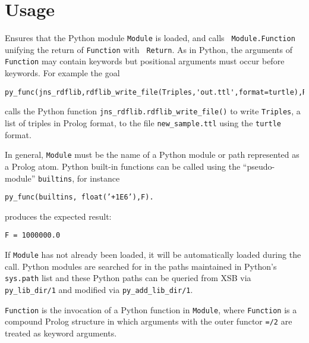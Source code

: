 \section{Usage}

\begin{description}

%
 Ensures that the Python module {\tt Module} is loaded, and calls {\tt
   Module.Function} unifying the return of {\tt Function} with {\tt
   Return}.  As in Python, the arguments of {\tt Function} may contain
 keywords but positional arguments must occur before keywords.  For
 example the goal

\begin{verbatim}
py_func(jns_rdflib,rdflib_write_file(Triples,'out.ttl',format=turtle),Ret).
\end{verbatim}

calls the Python function {\tt jns\_rdflib.rdflib\_write\_file()} to
write {\tt Triples}, a list of triples in Prolog format, to the file
{\tt new\_sample.ttl} using the {\tt turtle} format.

In general, {\tt Module} must be the name of a Python module or path
represented as a Prolog atom.  Python built-in functions can be called
using the ``pseudo-module'' {\tt builtins}, for instance

{\tt  py\_func(builtins, float('+1E6'),F).}

\noindent
produces the expected result:

{\tt F = 1000000.0}

\noindent
If {\tt Module} has not already been
  loaded, it will be automatically loaded during the call.  Python modules are
  searched for in the paths maintained in Python's {\tt sys.path} list
  and these Python paths can be queried from XSB via {\tt
    py\_lib\_dir/1} and modified via {\tt py\_add\_lib\_dir/1}.
     
{\tt Function} is the invocation of a Python function in {\tt Module},
where {\tt Function} is a compound Prolog structure in which arguments
with the outer functor {\tt =/2} are treated as keyword arguments.


\end{description}
